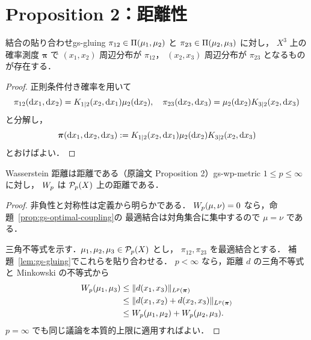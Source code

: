 \section{Proposition 2：距離性}
\label{sec:metric-property}

\begin{lemma}{結合の貼り合わせ}{gs-gluing}
  $\pi_{12}\in\Pi(\mu_1,\mu_2)$ と
  $\pi_{23}\in\Pi(\mu_2,\mu_3)$ に対し，
  $X^3$ 上の確率測度 $\boldsymbol{\pi}$ で
  $(x_1,x_2)$ 周辺分布が $\pi_{12}$，
  $(x_2,x_3)$ 周辺分布が $\pi_{23}$ となるものが存在する．
\end{lemma}

\begin{proof}
  正則条件付き確率を用いて
  \[
    \pi_{12}(\mathrm{d} x_1,\mathrm{d} x_2)
    =K_{1|2}(x_2,\mathrm{d} x_1)\mu_2(\mathrm{d} x_2),
    \quad
    \pi_{23}(\mathrm{d} x_2,\mathrm{d} x_3)
    =\mu_2(\mathrm{d} x_2)K_{3|2}(x_2,\mathrm{d} x_3)
  \]
  と分解し，
  \[
    \boldsymbol{\pi}(\mathrm{d} x_1,\mathrm{d} x_2,\mathrm{d} x_3)
    :=
    K_{1|2}(x_2,\mathrm{d} x_1)\mu_2(\mathrm{d} x_2)K_{3|2}(x_2,\mathrm{d} x_3)
  \]
  とおけばよい．
\end{proof}

\begin{proposition}{Wasserstein 距離は距離である（原論文 Proposition 2）}{gs-wp-metric}
  $1\leq p\leq\infty$ に対し，
  $W_p$ は $\mathcal{P}_{p}(X)$ 上の距離である．
\end{proposition}

\begin{proof}
  非負性と対称性は定義から明らかである．
  $W_p(\mu,\nu)=0$ なら，命題~\ref{prop:gs-optimal-coupling}の
  最適結合は対角集合に集中するので $\mu=\nu$ である．

  三角不等式を示す．$\mu_1,\mu_2,\mu_3\in\mathcal{P}_{p}(X)$ とし，
  $\pi_{12},\pi_{23}$ を最適結合とする．
  補題~\ref{lem:gs-gluing}でこれらを貼り合わせる．
  $p<\infty$ なら，距離 $d$ の三角不等式と Minkowski の不等式から
  \[
    \begin{aligned}
      W_p(\mu_1,\mu_3)
      &\leq \lVert d(x_1,x_3) \rVert_{L^p(\boldsymbol{\pi})} \\
      &\leq \lVert d(x_1,x_2)+d(x_2,x_3) \rVert_{L^p(\boldsymbol{\pi})} \\
      &\leq W_p(\mu_1,\mu_2)+W_p(\mu_2,\mu_3).
    \end{aligned}
  \]
  $p=\infty$ でも同じ議論を本質的上限に適用すればよい．
\end{proof}
